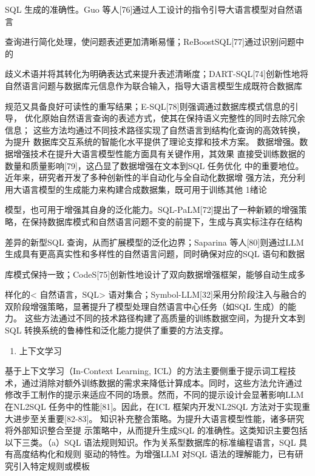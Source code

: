 \documentclass[12pt,a4paper,openright,UTF8]{ctexbook}
\begin{document}
SQL 生成的准确性。Guo 等人[76]通过人工设计的指令引导大语言模型对自然语言

查询进行简化处理，使问题表述更加清晰易懂；ReBoostSQL[77]通过识别问题中的

歧义术语并将其转化为明确表达式来提升表述清晰度；DART-SQL[74]创新性地将 自然语言问题与数据库元信息作为联合输入，指导大语言模型生成既符合数据库

规范又具备良好可读性的重写结果；E-SQL[78]则强调通过数据库模式信息的引导， 优化原始自然语言查询的表述方式，使其在保持语义完整性的同时去除冗余信息； 这些方法均通过不同技术路径实现了自然语言到结构化查询的高效转换，为提升 数据库交互系统的智能化水平提供了理论支撑和技术方案。 数据增强。数据增强技术在提升大语言模型性能方面具有关键作用，其效果 直接受训练数据的数量和质量影响[79]，这凸显了数据增强在文本到SQL 任务优化 中的重要地位。近年来，研究者开发了多种创新性的半自动化与全自动化数据增 强方法，充分利用大语言模型的生成能力来构建合成数据集，既可用于训练其他 1绪论

模型，也可用于增强其自身的泛化能力。SQL-PaLM[72]提出了一种新颖的增强策 略，在保持数据库模式和自然语言问题不变的前提下，生成与真实标注存在结构

差异的新型SQL 查询，从而扩展模型的泛化边界；Saparina 等人[80]则通过LLM 生成具有更高真实性和多样性的自然语言问题，同时确保对应的SQL 语句和数据

库模式保持一致；CodeS[75]创新性地设计了双向数据增强框架，能够自动生成多

样化的< 自然语言，SQL> 语对集合；Symbol-LLM[32]采用分阶段注入与融合的 双阶段增强策略，显著提升了模型处理自然语言中心任务（如SQL 生成）的能力。 这些方法通过不同的技术路径构建了高质量的训练数据空间，为提升文本到SQL 转换系统的鲁棒性和泛化能力提供了重要的方法支撑。

\begin{enumerate}[label=(\arabic*)]
\item 上下文学习
\end{enumerate}
基于上下文学习（In-Context Learning, ICL）的方法主要侧重于提示词工程技 术，通过消除对额外训练数据的需求来降低计算成本。同时，这些方法允许通过 修改手工制作的提示来适应不同的场景。然而，不同的提示设计会显著影响LLM 在NL2SQL 任务中的性能[81]。因此，在ICL 框架内开发NL2SQL 方法对于实现重 大进步至关重要[82-83]。 知识补充整合策略。为提升大语言模型性能，诸多研究将外部知识整合至提 示策略中，从而提升生成SQL 的准确性。这类知识主要包括以下三类。（a）SQL 语法规则知识。作为关系型数据库的标准编程语言，SQL 具有高度结构化和规则 驱动的特性。为增强LLM 对SQL 语法的理解能力，已有研究引入特定规则或模板
\end{document}
